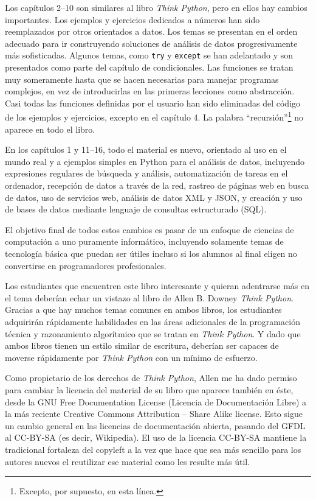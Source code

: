 Los capítulos 2--10 son similares al libro \emph{Think Python},
pero en ellos hay cambios importantes. Los ejemplos y ejercicios
dedicados a números han sido reemplazados por otros orientados a datos.
Los temas se presentan en el orden adecuado para ir construyendo soluciones
de análisis de datos progresivamente más sofisticadas.
Algunos temas, como {\tt try} y {\tt except} se han adelantado
y son presentados como parte del capítulo de condicionales.
Las funciones se tratan muy someramente hasta que se hacen necesarias
para manejar programas complejos, en vez de introducirlas en las primeras
lecciones como abstracción. Casi todas las funciones definidas por el usuario
han sido eliminadas del código de los ejemplos y ejercicios, excepto en el capítulo 4.
La palabra ``recursión''\footnote{Excepto, por supuesto, en esta línea.}
no aparece en todo el libro.

En los capítulos 1 y 11--16, todo el material es nuevo, orientado
al uso en el mundo real y a ejemplos simples en Python para el
análisis de datos, incluyendo expresiones regulares de búsqueda y análisis,
automatización de tareas en el ordenador, recepción de datos a través de la red,
rastreo de páginas web en busca de datos,
uso de servicios web, análisis de datos XML y JSON, y creación y uso
de bases de datos mediante lenguaje de consultas estructurado (SQL).

El objetivo final de todos estos cambios es pasar de un enfoque
de ciencias de computación a uno puramente informático, incluyendo
solamente temas de tecnología básica que puedan
ser útiles incluso si los alumnos al final eligen no convertirse en
programadores profesionales.

Los estudiantes que encuentren este libro interesante y quieran adentrarse
más en el tema deberían echar un vistazo al libro de Allen B. Downey
\emph{Think Python}. Gracias a que hay muchos temas comunes en ambos libros,
los estudiantes adquirirán rápidamente habilidades en las áreas adicionales
de la programación técnica y razonamiento algorítmico que se tratan en
\emph{Think Python}.
Y dado que ambos libros tienen un estilo similar de escritura, deberían ser
capaces de moverse rápidamente por \emph{Think Python} con un mínimo de esfuerzo.

Como propietario de los derechos de \emph{Think Python},
Allen me ha dado permiso para cambiar la licencia
del material de su libro que aparece también en éste,
desde la
GNU Free Documentation License (Licencia de Documentación Libre)
a la más reciente
Creative Commons Attribution -- Share Alike license.
Esto sigue un cambio general en las licencias de documentación abierta,
pasando del GFDL al CC-BY-SA (es decir, Wikipedia).
El uso de la licencia CC-BY-SA mantiene la tradicional fortaleza del copyleft
a la vez que hace que sea más sencillo para los autores nuevos
el reutilizar ese material como les resulte más útil.

